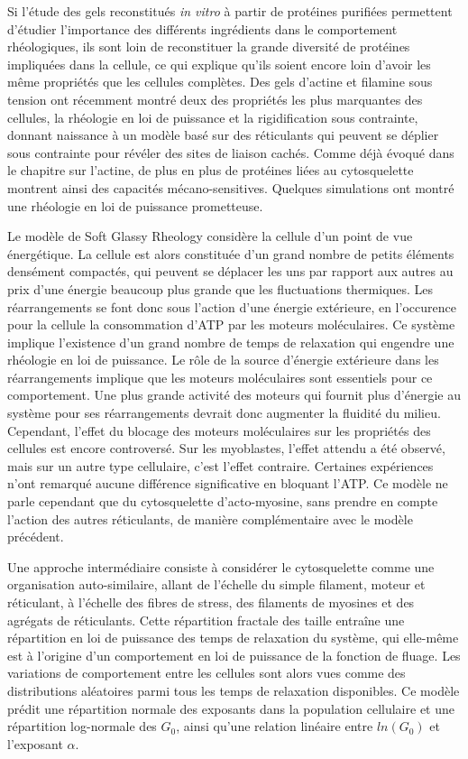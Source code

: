 Si l'étude des gels reconstitués \textit{in vitro} à partir de protéines purifiées permettent d'étudier l'importance des différents ingrédients dans le comportement rhéologiques, ils sont loin de reconstituer la grande diversité de protéines impliquées dans la cellule, ce qui explique qu'ils soient encore loin d'avoir les même propriétés que les cellules complètes. 
Des gels d'actine et filamine sous tension ont récemment montré deux des propriétés les plus marquantes des cellules, la rhéologie en loi de puissance et la rigidification sous contrainte, donnant naissance à un modèle basé sur des réticulants qui peuvent se déplier sous contrainte pour révéler des sites de liaison cachés. Comme déjà évoqué dans le chapitre sur l'actine, de plus en plus de protéines liées au cytosquelette montrent ainsi des capacités mécano-sensitives. Quelques simulations ont montré une rhéologie en loi de puissance prometteuse. 

Le modèle de Soft Glassy Rheology considère la cellule d'un point de vue énergétique. 
La cellule est alors constituée d'un grand nombre de petits éléments densément compactés, qui peuvent se déplacer les uns par rapport aux autres au prix d'une énergie beaucoup plus grande que les fluctuations thermiques. 
Les réarrangements se font donc sous l'action d'une énergie extérieure, en l'occurence pour la cellule la consommation d'ATP par les moteurs moléculaires. 
Ce système implique l'existence d'un grand nombre de temps de relaxation qui engendre une rhéologie en loi de puissance. 
Le rôle de la source d'énergie extérieure dans les réarrangements implique que les moteurs moléculaires sont essentiels pour ce comportement. Une plus grande activité des moteurs qui fournit plus d'énergie au système pour ses réarrangements devrait donc augmenter la fluidité du milieu. 
Cependant, l'effet du blocage des moteurs moléculaires sur les propriétés des cellules est encore controversé. Sur les myoblastes, l'effet attendu a été observé, mais sur un autre type cellulaire, c'est l'effet contraire. Certaines expériences n'ont remarqué aucune différence significative en bloquant l'ATP. 
Ce modèle ne parle cependant que du cytosquelette d'acto-myosine, sans prendre en compte l'action des autres réticulants, de manière complémentaire avec le modèle précédent. 

Une approche intermédiaire consiste à considérer le cytosquelette comme une organisation auto-similaire, allant de l'échelle du simple filament, moteur et réticulant, à l'échelle des fibres de stress, des filaments de myosines et des agrégats de réticulants. 
Cette répartition fractale des taille entraîne une répartition en loi de puissance des temps de relaxation du système, qui elle-même est à l'origine d'un comportement en loi de puissance de la fonction de fluage. Les variations de comportement entre les cellules sont alors vues comme des distributions aléatoires parmi tous les temps de relaxation disponibles. Ce modèle prédit une répartition normale des exposants dans la population cellulaire et une répartition log-normale des $G_0$, ainsi qu'une relation linéaire entre $ln(G_0)$ et l'exposant $\alpha$. 



